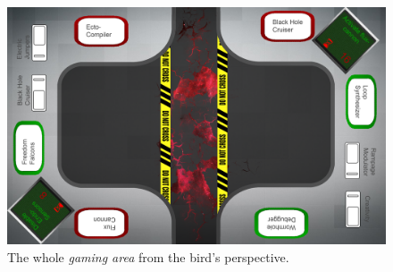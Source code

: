 \documentclass{sigchi}
\begin{document}
\begin{figure}[H]
\centering
\includegraphics[width=0.9\columnwidth]{walkthrough/gamingarea}
\caption{The whole \textit{gaming area} from the bird's perspective.}
\label{fig:beamingArea}
\end{figure}
\vspace{2mm}
\end{document}
